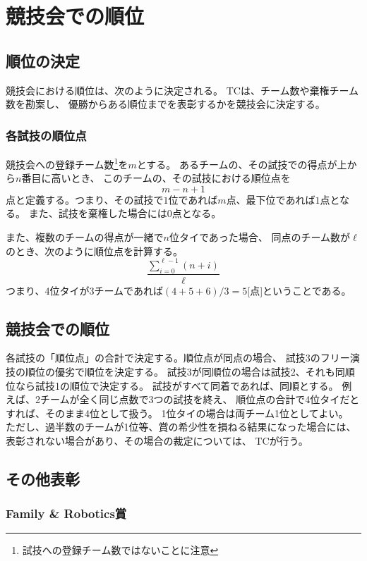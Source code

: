 \documentclass[a4j]{jarticle}
\begin{document}
\section{競技会での順位}

\subsection{順位の決定}

競技会における順位は、次のように決定される。
TCは、チーム数や棄権チーム数を勘案し、
優勝からある順位までを表彰するかを競技会に決定する。

\subsubsection{各試技の順位点}

競技会への登録チーム数\footnote{試技への登録チーム数ではないことに注意}を$m$とする。
あるチームの、その試技での得点が上から$n$番目に高いとき、
このチームの、その試技における順位点を
\[
	m - n + 1
\]
点と定義する。つまり、その試技で$1$位であれば$m$点、最下位であれば$1$点となる。
また、試技を棄権した場合には$0$点となる。

また、複数のチームの得点が一緒で$n$位タイであった場合、
同点のチーム数が$\ell$のとき、次のように順位点を計算する。
\[
	\dfrac{\sum_{i=0}^{\ell-1}(n + i)}{\ell}
\]
つまり、4位タイが3チームであれば$(4+5+6)/3=5$[点]ということである。


\subsection{競技会での順位}

各試技の「順位点」の合計で決定する。順位点が同点の場合、
試技3のフリー演技の順位の優劣で順位を決定する。
試技3が同順位の場合は試技2、それも同順位なら試技1の順位で決定する。
試技がすべて同着であれば、同順とする。
例えば、2チームが全く同じ点数で3つの試技を終え、
順位点の合計で4位タイだとすれば、そのまま4位として扱う。
1位タイの場合は両チーム1位としてよい。
ただし、過半数のチームが1位等、賞の希少性を損ねる結果になった場合には、
表彰されない場合があり、その場合の裁定については、
TCが行う。

\subsection{その他表彰}

\subsubsection{Family \& Robotics賞}
\end{document}
